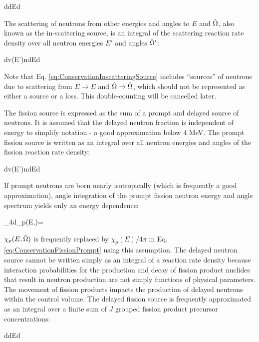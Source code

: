 \beq
\label{eq:ConservationExternalSource}
\left\lbrack\int d\volume \source \right\rbrack dEd\hO  
\eeq

The scattering of neutrons from other energies and angles to \(E\) and \(\hat{\Omega}\), also known as the in-scattering source, is an integral of the scattering reaction rate density over all neutron energies \(E'\) and angles \(\hat{\Omega}'\):

\beq
\label{eq:ConservationInscatteringSource}
\left\lbrack\int d\volume\inscatteringsource v(E')n\seatelse\right\rbrack dEd\hO  
\eeq

Note that Eq. \eqref{eq:ConservationInscatteringSource} includes ``sources'' of neutrons due to scattering from \(E\rightarrow E\) and \(\hat{\Omega}\rightarrow\hat{\Omega}\), which should not be represented as either a source or a loss. This double-counting will be cancelled later.

The fission source is expressed as the sum of a prompt and delayed source of neutrons. It is assumed that the delayed neutron fraction is independent of energy to simplify notation - a good approximation below 4 MeV. The prompt fission source is written as an integral over all neutron energies and angles of the fission reaction rate density:

\beq
\label{eq:ConservationFissionPrompt}
\left\lbrack\int d\volume\promptfissionsource v(E')n\seatelse\right\rbrack dEd\hO
\eeq

If prompt neutrons are born nearly isotropically (which is frequently a good approximation), angle integration of the prompt fission neutron energy and angle spectrum yields only an energy dependence:

\beq
\label{eq:prompt_isotropic}
\int_{4\pi}d\hO \chi_p(E,\hO)=
\eeq

\(\chi_p(E,\hat{\Omega})\) is frequently replaced by \(\chi_p(E)/4\pi\) in Eq. \eqref{eq:ConservationFissionPrompt} using this assumption. The delayed neutron source cannot be written simply as an integral of a reaction rate density because interaction probabilities for the production and decay of fission product nuclides that result in neutron production are not simply functions of physical parameters. The movement of fission products impacts the production of delayed neutrons within the control volume. The delayed fission source is frequently approximated as an integral over a finite sum of \(J\) grouped fission product precursor concentrations:

\beq
\label{eq:ConservationFissionDelayed}
\left\lbrack\int d\volume \delayedfissionsource\right\rbrack dEd\hO  
\eeq


